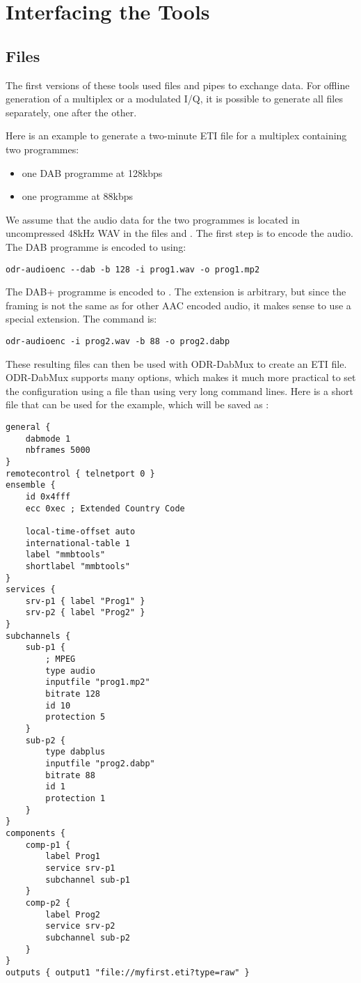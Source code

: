 \section{Interfacing the Tools}
\subsection{Files}
\label{sec-files}
The first versions of these tools used files and pipes to exchange data. For
offline generation of a multiplex or a modulated I/Q, it is possible to
generate all files separately, one after the other.

Here is an example to generate a two-minute ETI file for a multiplex containing
two programmes:
\begin{itemize}
    \item one DAB programme at 128kbps
    \item one \dabplus{} programme at 88kbps
\end{itemize}

We assume that the audio data for the two programmes is located in uncompressed
48kHz WAV in the files  and . The first step
is to encode the audio. The DAB programme is encoded to  using:
\begin{lstlisting}
odr-audioenc --dab -b 128 -i prog1.wav -o prog1.mp2
\end{lstlisting}

The DAB+ programme is encoded to . The extension
 is arbitrary, but since the framing is not the same as for
other AAC encoded audio, it makes sense to use a special extension. The command
is:
\begin{lstlisting}
odr-audioenc -i prog2.wav -b 88 -o prog2.dabp
\end{lstlisting}

These resulting files can then be used with ODR-DabMux to create an ETI file.
ODR-DabMux supports many options, which makes it much more practical to set
the configuration using a file than using very long command lines. Here is a short
file that can be used for the example, which will be saved as :
\begin{lstlisting}
general {
    dabmode 1
    nbframes 5000
}
remotecontrol { telnetport 0 }
ensemble {
    id 0x4fff
    ecc 0xec ; Extended Country Code

    local-time-offset auto
    international-table 1
    label "mmbtools"
    shortlabel "mmbtools"
}
services {
    srv-p1 { label "Prog1" }
    srv-p2 { label "Prog2" }
}
subchannels {
    sub-p1 {
        ; MPEG
        type audio
        inputfile "prog1.mp2"
        bitrate 128
        id 10
        protection 5
    }
    sub-p2 {
        type dabplus
        inputfile "prog2.dabp"
        bitrate 88
        id 1
        protection 1
    }
}
components {
    comp-p1 {
        label Prog1
        service srv-p1
        subchannel sub-p1
    }
    comp-p2 {
        label Prog2
        service srv-p2
        subchannel sub-p2
    }
}
outputs { output1 "file://myfirst.eti?type=raw" }
\end{lstlisting}

